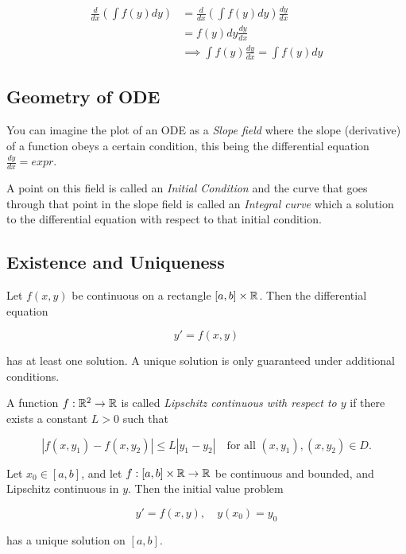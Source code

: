 \begin{align*}
\frac{d}{dx} \left( \int f(y) dy \right) &= \frac{d}{dx} \left( \int f(y) dy \right) \frac{dy}{dx}\\
                                         &= f(y) dy \frac{dy}{dx}\\
                                         &\implies \int f(y) \frac{dy}{dx} = \int f(y) dy
\end{align*}
\QED

\subsection{Geometry of ODE}

You can imagine the plot of an ODE as a \emph{Slope field} where the slope (derivative) of a function
obeys a certain condition, this being the differential equation \(\frac{dy}{dx} = expr\).
\vspace{\baselineskip}

A point on this field is called an \emph{Initial Condition} and the curve that goes through
that point in the slope field is called an \emph{Integral curve} which a solution to the differential
equation with respect to that initial condition.

\subsection{Existence and Uniqueness}

Let \( f(x, y) \) be continuous on a rectangle \( [a, b] \times \mathbb{R} \). Then the differential 
equation

\[
    y' = f(x, y)
\]

has at least one solution. A unique solution is only guaranteed under additional conditions.

A function \( f : \mathbb{R}^2 \to \mathbb{R} \) is called 
\emph{Lipschitz continuous with respect to \( y \)} if there exists a constant \( L > 0 \) such that

\[
    |f(x, y_1) - f(x, y_2)| \leq L |y_1 - y_2|
    \quad \text{for all } (x, y_1), (x, y_2) \in D.
\]

Let \( x_0 \in [a, b] \), and let \( f : [a, b] \times \mathbb{R} \to \mathbb{R} \) be continuous 
and bounded, and Lipschitz continuous in \( y \). Then the initial value problem

\[
    y' = f(x, y), \quad y(x_0) = y_0
\]

has a unique solution on \( [a, b] \).
\vspace{\baselineskip}

